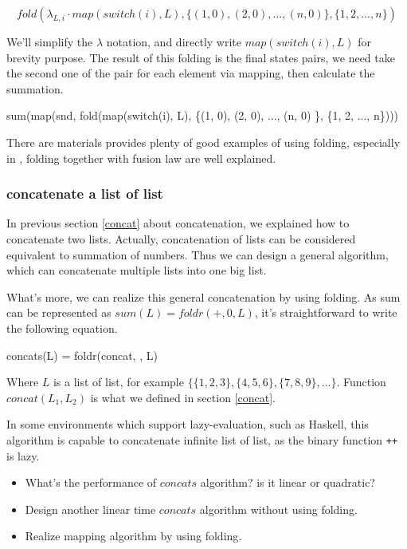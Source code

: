 \documentclass[b5paper]{article}
\begin{document}
\[
fold(\lambda_{L, i} \cdot map(switch(i), L), \{(1, 0), (2, 0), ..., (n, 0) \}, \{1, 2, ..., n\})
\]

We'll simplify the $\lambda$ notation, and directly write $map(switch(i), L)$ for brevity purpose.
The result of this folding is the final states pairs, we need take the second one of the pair
for each element via mapping, then calculate the summation.

\be
sum(map(snd, fold(map(switch(i), L), \{(1, 0), (2, 0), ..., (n, 0) \}, \{1, 2, ..., n\})))
\ee

There are materials provides plenty of good examples of using folding, especially in \cite{fp-pearls},
folding together with fusion law are well explained.

\subsubsection{concatenate a list of list}
In previous section \ref{concat} about concatenation, we explained how to concatenate two lists.
Actually, concatenation of lists can be considered equivalent to summation of numbers. Thus we
can design a general algorithm, which can concatenate multiple lists into one big list.

What's more, we can realize this general concatenation by using folding. As sum can be represented
as $sum(L) = foldr(+, 0, L)$, it's straightforward to write the following equation.

\be
concats(L) = foldr(concat, \phi, L)
\ee

Where $L$ is a list of list, for example $\{\{1, 2, 3\}, \{4, 5, 6\}, \{7, 8, 9\}, ...\}$. Function
$concat(L_1, L_2)$ is what we defined in section \ref{concat}.

In some environments which support lazy-evaluation, such as Haskell, this algorithm is capable to
concatenate infinite list of list, as the binary function \texttt{++} is lazy.

\begin{Exercise}
\begin{itemize}
\item What's the performance of $concats$ algorithm? is it linear or quadratic?
\item Design another linear time $concats$ algorithm without using folding.
\item Realize mapping algorithm by using folding.
\end{itemize}
\end{Exercise}
\end{document}
